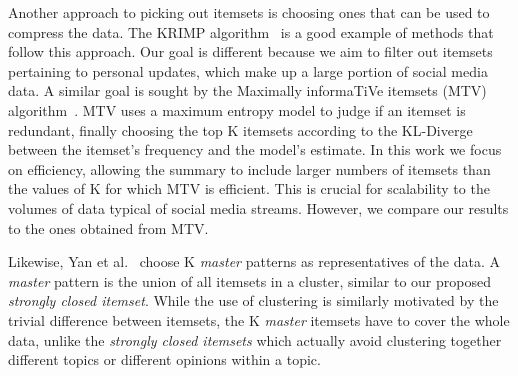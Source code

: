 \documentclass{sig-alternate}
\begin{document}
Another approach to picking out itemsets is choosing ones that 
can be used to compress the data. The KRIMP algorithm~\cite{vreeken2011krimp} is 
a good example of methods that follow this approach. Our goal is different because
we aim to filter out itemsets pertaining to personal updates, which make up a large
portion of social media data. 
A similar goal is sought by the Maximally informaTiVe itemsets (MTV) algorithm~\cite{mampaey2011tell}. 
MTV uses a maximum entropy model to judge if an itemset is redundant, finally choosing the
top K itemsets according to the KL-Diverge between the itemset's  frequency and  the model's estimate. 
In this work we focus on efficiency, allowing the summary to include larger numbers
of itemsets than the values of K for which MTV is efficient.
This is crucial for scalability to the volumes of data typical of social media streams.
However, we compare our results to the ones obtained from MTV.

Likewise, Yan et al.~\cite{yan2005summarizing} choose 
K \emph{master} patterns as representatives of the data. 
A \emph{master} pattern is the union of all itemsets in a 
cluster, similar to our proposed \emph{strongly closed itemset}. 
While the use of clustering is similarly motivated by 
the trivial difference between itemsets, 
the K \emph{master} itemsets  have to cover the whole data, 
unlike the \emph{strongly closed itemsets} which actually 
avoid clustering together different topics or different opinions within a topic.

\end{document}
